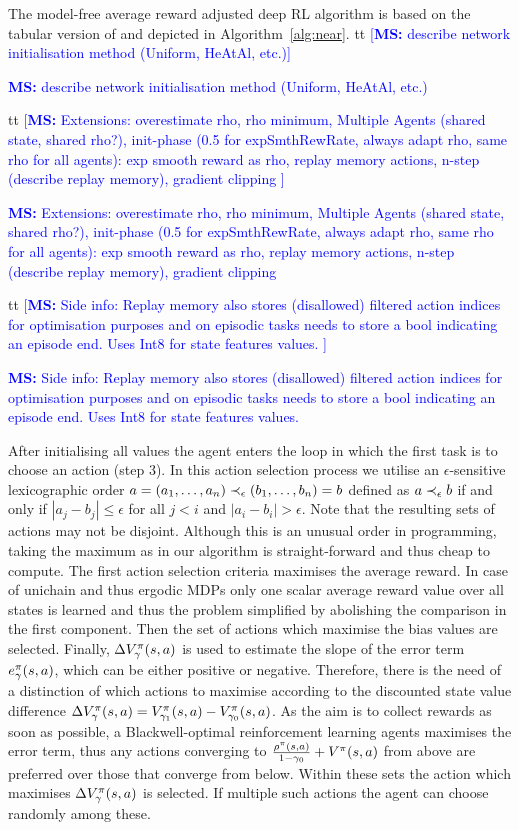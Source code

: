 \documentclass[envcountsame]{llncs}
\newcommand\MS[2][r]{\ifx t#1 \textcolor{blue}{[\textbf{MS:} #2]}
  \else \begin{center}\textcolor{blue}{\textbf{MS:} #2} \end{center} \fi}
\begin{document}
The model-free average reward adjusted deep RL algorithm is based on the tabular
version of \citet{schneckenreither2020average} and depicted in Algorithm~\ref{alg:near}.
%
%
%
\MS[t]{describe network initialisation method (Uniform, HeAtAl, etc.)}
%
\MS[t]{Extensions: overestimate rho, rho minimum, Multiple Agents (shared state,  shared rho?),
  init-phase (0.5 for expSmthRewRate, always adapt rho, same rho for all agents): exp smooth reward
  as rho, replay memory actions, n-step (describe replay memory), gradient clipping }
\MS[t]{Side info: Replay memory also stores (disallowed) filtered action indices for optimisation purposes and on
episodic tasks needs to store a bool indicating an episode end. Uses Int8 for state features values.  }

%
%
After initialising all values the agent enters the loop in which the first task is to choose an
action (step 3). In this action selection process we utilise an \(\epsilon\)-sensitive lexicographic
order \(a=(a_{1},\ldots,a_{n}) \prec_{\epsilon} (b_{1},\ldots,b_{n})=b\) defined as \(a \prec_{\epsilon} b\) if and only if
\(| a_{j} - b_{j} | \leqslant \epsilon\) for all \(j < i\) and \(|a_{i} - b_{i}| > \epsilon\). Note
that the resulting sets of actions may not be disjoint. Although this is an unusual order in
programming, taking the maximum as in our algorithm is straight-forward and thus cheap to compute.
%
The first action selection criteria maximises the average reward. In case of unichain and thus
ergodic MDPs only one scalar average reward value over all states is learned and thus the problem
simplified by abolishing the comparison in the first component. Then the set of actions which
maximise the bias values are selected. Finally, \(\Delta V^\pi_\gamma(s,a)\) is used to estimate
the slope of the error term \(e_{\gamma}^{\pi}(s,a)\), which can be either positive or negative.
Therefore, there is the need of a distinction of which actions to maximise according to the
discounted state value difference
\(\Delta V^{\pi}_{\gamma}(s,a) = V^\pi_{\gamma_1}(s,a) - V^\pi_{\gamma_0}(s,a)\). As the aim is
to collect rewards as soon as possible, a Blackwell-optimal reinforcement learning agents maximises
the error term, thus any actions converging to
\(\frac{\rho^{\pi}(s,a)}{1-\gamma_{0}} + V^{\pi}(s,a)\) from above are preferred over those
that converge from below. Within these sets the action which maximises
\(\Delta V^{\pi}_{\gamma}(s,a)\) is selected. If multiple such actions the agent can choose
randomly among these.
\end{document}
